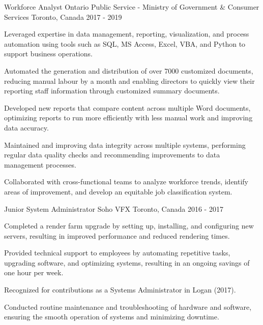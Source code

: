 \begin{cventries}
\cventry
  {Workforce Analyst}
  {Ontario Public Service - Ministry of Government \& Consumer Services}
  {Toronto, Canada}
  {2017 - 2019}
  {
    \begin{cvitems}
      \item Leveraged expertise in data management, reporting, visualization, and process automation using tools such as SQL, MS Access, Excel, VBA, and Python to support business operations.
      \item Automated the generation and distribution of over 7000 customized documents, reducing manual labour by a month and enabling directors to quickly view their reporting staff information through customized summary documents.
      \item Developed new reports that compare content across multiple Word documents, optimizing reports to run more efficiently with less manual work and improving data accuracy.
      \item Maintained and improving data integrity across multiple systems, performing regular data quality checks and recommending improvements to data management processes.
      \item Collaborated with cross-functional teams to analyze workforce trends, identify areas of improvement, and develop an equitable job classification system.
    \end{cvitems}
  }

\cventry
  {Junior System Administrator}
  {Soho VFX}
  {Toronto, Canada}
  {2016 - 2017}
  {
    \begin{cvitems}
      \item Completed a render farm upgrade by setting up, installing, and configuring new servers, resulting in improved performance and reduced rendering times.
      \item Provided technical support to employees by automating repetitive tasks, upgrading software, and optimizing systems, resulting in an ongoing savings of one hour per week.
      \item Recognized for contributions as a Systems Administrator in Logan (2017).
      \item Conducted routine maintenance and troubleshooting of hardware and software, ensuring the smooth operation of systems and minimizing downtime.
    \end{cvitems}
  }

\end{cventries}
